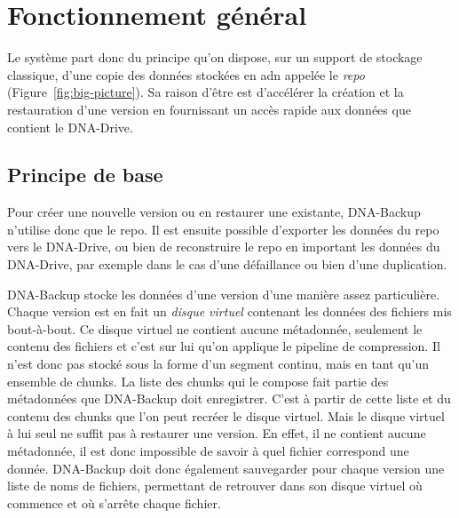 \documentclass[a4paper]{report}
\begin{document}
\section{Fonctionnement général}

Le système part donc du principe qu'on dispose, sur un support de stockage classique,
d'une copie des données stockées en \ac{adn} appelée le \emph{repo} (Figure~\ref{fig:big-picture}).
Sa raison d'être est d'accélérer la création et la restauration d'une version
en fournissant un accès rapide aux données que contient le DNA-Drive.

\begin{figure*}[ht]
\centering


\caption{Le repo est une zone intermédiaire entre le dossier source à sauvegarder et le DNA-Drive.}
\label{fig:big-picture}
\end{figure*}

\subsection{Principe de base}

Pour créer une nouvelle version ou en restaurer une existante, DNA-Backup n'utilise donc que le repo.
Il est ensuite possible d'exporter les données du repo vers le DNA-Drive,
ou bien de reconstruire le repo en important les données du DNA-Drive,
par exemple dans le cas d'une défaillance ou bien d'une duplication.

DNA-Backup stocke les données d'une version d'une manière assez particulière.
Chaque version est en fait un \emph{disque virtuel} contenant les données des fichiers mis bout-à-bout.
Ce disque virtuel ne contient aucune métadonnée, seulement le contenu des fichiers
et c'est sur lui qu'on applique le pipeline de compression.
Il n'est donc pas stocké sous la forme d'un segment continu, mais en tant qu'un ensemble de chunks.
La liste des chunks qui le compose fait partie des métadonnées que DNA-Backup doit enregistrer.
C'est à partir de cette liste et du contenu des chunks que l'on peut recréer le disque virtuel.
Mais le disque virtuel à lui seul ne suffit pas à restaurer une version.
En effet, il ne contient aucune métadonnée,
il est donc impossible de savoir à quel fichier correspond une donnée.
DNA-Backup doit donc également sauvegarder pour chaque version une liste de noms de fichiers,
permettant de retrouver dans son disque virtuel où commence et où s'arrête chaque fichier.
\end{document}
